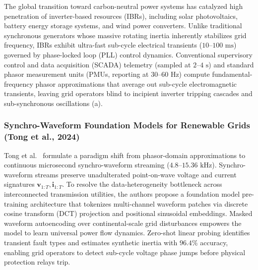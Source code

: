 The global transition toward carbon-neutral power systems has catalyzed high penetration of inverter-based resources (IBRs), including solar photovoltaics, battery energy storage systems, and wind power converters. Unlike traditional synchronous generators whose massive rotating inertia inherently stabilizes grid frequency, IBRs exhibit ultra-fast sub-cycle electrical transients ($10$--$100\text{ ms}$) governed by phase-locked loop (PLL) control dynamics. Conventional supervisory control and data acquisition (SCADA) telemetry (sampled at $2$--$4\text{ s}$) and standard phasor measurement units (PMUs, reporting at $30$--$60\text{ Hz}$) compute fundamental-frequency phasor approximations that average out sub-cycle electromagnetic transients, leaving grid operators blind to incipient inverter tripping cascades and sub-synchronous oscillations (a).

\subsubsection{Synchro-Waveform Foundation Models for Renewable Grids (Tong et al., 2024)}
Tong et al.~\cite{Tong2024GridMonitoring} formulate a paradigm shift from phasor-domain approximations to continuous microsecond synchro-waveform streaming ($4.8$--$15.36\text{ kHz}$). Synchro-waveform streams preserve unadulterated point-on-wave voltage and current signatures $\mathbf{v}_{1:T}, \mathbf{i}_{1:T}$. To resolve the data-heterogeneity bottleneck across interconnected transmission utilities, the authors propose a foundation model pre-training architecture that tokenizes multi-channel waveform patches via discrete cosine transform (DCT) projection and positional sinusoidal embeddings. Masked waveform autoencoding over continental-scale grid disturbances empowers the model to learn universal power flow dynamics. Zero-shot linear probing identifies transient fault types and estimates synthetic inertia with $96.4\%$ accuracy, enabling grid operators to detect sub-cycle voltage phase jumps before physical protection relays trip.

